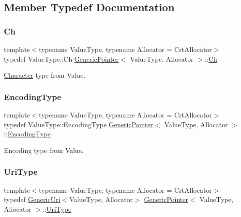 \subsection{Member Typedef Documentation}
\mbox{\label{classGenericPointer_ab292356c11b4015c98d21b966b11f285}} 
\subsubsection{\texorpdfstring{Ch}{Ch}}
{\footnotesize\ttfamily template$<$typename Value\+Type, typename Allocator = Crt\+Allocator$>$ \\
typedef Value\+Type\+::\+Ch \hyperlink{classGenericPointer}{Generic\+Pointer}$<$ Value\+Type, Allocator $>$\+::\hyperlink{classGenericPointer_ab292356c11b4015c98d21b966b11f285}{Ch}}



\hyperlink{structCharacter}{Character} type from Value. 

\mbox{\label{classGenericPointer_a4b802da797a7a0b615fd9611cedb7c3b}} 
\subsubsection{\texorpdfstring{Encoding\+Type}{EncodingType}}
{\footnotesize\ttfamily template$<$typename Value\+Type, typename Allocator = Crt\+Allocator$>$ \\
typedef Value\+Type\+::\+Encoding\+Type \hyperlink{classGenericPointer}{Generic\+Pointer}$<$ Value\+Type, Allocator $>$\+::\hyperlink{classGenericPointer_a4b802da797a7a0b615fd9611cedb7c3b}{Encoding\+Type}}



Encoding type from Value. 

\mbox{\label{classGenericPointer_ac82bc56506218e49644bbbbe752a86cc}} 
\subsubsection{\texorpdfstring{Uri\+Type}{UriType}}
{\footnotesize\ttfamily template$<$typename Value\+Type, typename Allocator = Crt\+Allocator$>$ \\
typedef \hyperlink{classGenericUri}{Generic\+Uri}$<$Value\+Type, Allocator$>$ \hyperlink{classGenericPointer}{Generic\+Pointer}$<$ Value\+Type, Allocator $>$\+::\hyperlink{classGenericPointer_ac82bc56506218e49644bbbbe752a86cc}{Uri\+Type}}



